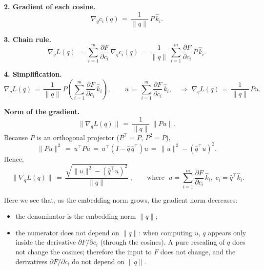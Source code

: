 \noindent\textbf{2. Gradient of each cosine.}
\begin{equation}
\nabla_q c_i(q) \,=\, \frac{1}{\|q\|}\,P\,\hat k_i.
\end{equation}

\noindent\textbf{3. Chain rule.}
\begin{equation}
\nabla_q L(q) \,=\, \sum_{i=1}^{m} \frac{\partial F}{\partial c_i}\,\nabla_q c_i(q) \,=\, \frac{1}{\|q\|}\,\sum_{i=1}^{m} \frac{\partial F}{\partial c_i}\,P\,\hat k_i.
\end{equation}

\noindent\textbf{4. Simplification.}
\begin{equation}
\nabla_q L(q) \,=\, \frac{1}{\|q\|}\,P\left( \sum_{i=1}^{m} \frac{\partial F}{\partial c_i}\,\hat k_i \right),\qquad u \,=\, \sum_{i=1}^{m} \frac{\partial F}{\partial c_i}\,\hat k_i,\quad \Rightarrow\; \nabla_q L(q) \,=\, \frac{1}{\|q\|}\,P u.
\end{equation}

\noindent\textbf{Norm of the gradient.}
\begin{equation}
\bigl\|\nabla_q L(q)\bigr\| \,=\, \frac{1}{\|q\|}\,\bigl\|P u\bigr\|.
\end{equation}
Because $P$ is an orthogonal projector ($P^{\!\top}=P$, $P^2=P$),
\begin{equation}
\bigl\|P u\bigr\|^{2} \,=\, u^{\!\top} P u \,=\, u^{\!\top}(I - \hat q\,\hat q^{\!\top})u \,=\, \|u\|^{2} - (\hat q^{\!\top}u)^{2}.
\end{equation}
Hence,
\begin{equation}
\boxed{\; \bigl\|\nabla_q L(q)\bigr\| \,=\, \frac{\sqrt{\|u\|^{2} - (\hat q^{\!\top}u)^{2}}}{\|q\|} \;},\qquad \text{where }\; u = \sum_{i=1}^{m} \frac{\partial F}{\partial c_i}\,\hat k_i,\; c_i = \hat q^{\!\top}\hat k_i.
\end{equation}

Here we see that, as the embedding norm grows, the gradient norm decreases:
\begin{itemize}
  \item the denominator is the embedding norm $\|q\|$;
  \item the numerator does not depend on $\|q\|$: when computing $u$, $q$ appears only inside the derivative $\partial F/\partial c_i$ (through the cosines). A pure rescaling of $q$ does not change the cosines; therefore the input to $F$ does not change, and the derivatives $\partial F/\partial c_i$ do not depend on $\|q\|$.
\end{itemize}



